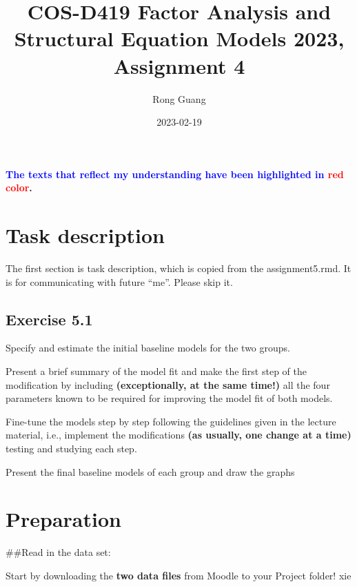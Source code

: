\documentclass[
]{article}
\title{COS-D419 Factor Analysis and Structural Equation Models 2023, Assignment 4}
\author{Rong Guang}
\date{2023-02-19}
\begin{document}
\maketitle

{
\setcounter{tocdepth}{2}
\tableofcontents
}
\textbf{\textcolor{blue}{The texts that reflect my understanding have been highlighted in} \textcolor{red}{red color}.}

\hypertarget{task-description}{%
\section{Task description}\label{task-description}}

The first section is task description, which is copied from the assignment5.rmd. It is for communicating with future ``me''. Please skip it.

\hypertarget{exercise-5.1}{%
\subsection{Exercise 5.1}\label{exercise-5.1}}

Specify and estimate the initial baseline models for the two groups.

Present a brief summary of the model fit and make the first step of the modification by including \textbf{(exceptionally, at the same time!)} all the four parameters known to be required for improving the model fit of both models.

Fine-tune the models step by step following the guidelines given in the lecture material, i.e., implement the modifications \textbf{(as usually, one change at a time)} testing and studying each step.

Present the final baseline models of each group and draw the graphs

\hypertarget{preparation}{%
\section{Preparation}\label{preparation}}

\#\#Read in the data set:

Start by downloading the \textbf{two data files} from Moodle to your Project folder!
xie
\end{document}
